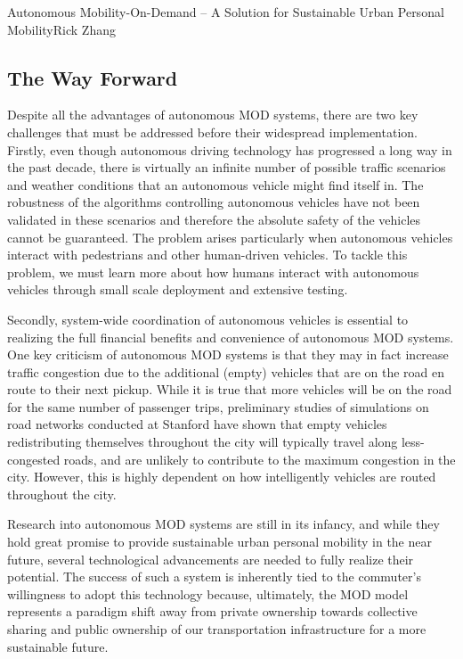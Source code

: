 \documentclass{papertex}
\begin{document}
\begin{news}{2}{Autonomous Mobility-On-Demand – A Solution for Sustainable Urban Personal Mobility}{Rick Zhang}{}{}
\subsection*{\textbf{The Way Forward}}

Despite all the advantages of autonomous MOD systems, there are two key 
challenges that must be addressed before their widespread implementation. 
Firstly, even though autonomous driving technology has progressed a long way 
in the past decade, there is virtually an infinite number of possible traffic 
scenarios and weather conditions that an autonomous vehicle might find itself 
in. The robustness of the algorithms controlling autonomous vehicles have not 
been validated in these scenarios and therefore the absolute safety of the 
vehicles cannot be guaranteed. The problem arises particularly when autonomous 
vehicles interact with pedestrians and other human-driven vehicles. To tackle 
this problem, we must learn more about how humans interact with autonomous 
vehicles through small scale deployment and extensive testing.

Secondly, system-wide coordination of autonomous vehicles is essential to 
realizing the full financial benefits and convenience of autonomous MOD 
systems. One key criticism of autonomous MOD systems is that they may in fact 
increase traffic congestion due to the additional (empty) vehicles that are on 
the road en route to their next pickup. While it is true that more vehicles 
will be on the road for the same number of passenger trips, preliminary studies 
of simulations on road networks conducted at Stanford have shown that empty 
vehicles redistributing themselves throughout the city will typically travel 
along less-congested roads, and are unlikely to contribute to the maximum 
congestion in the city. However, this is highly dependent on how intelligently 
vehicles are routed throughout the city.

Research into autonomous MOD systems are still in its infancy, and while they 
hold great promise to provide sustainable urban personal mobility in the near 
future, several technological advancements are needed to fully realize their 
potential. The success of such a system is inherently tied to the commuter’s 
willingness to adopt this technology because, ultimately, the MOD model 
represents a paradigm shift away from private ownership towards collective 
sharing and public ownership of our transportation infrastructure for a more 
sustainable future.

\end{news}
\end{document}
